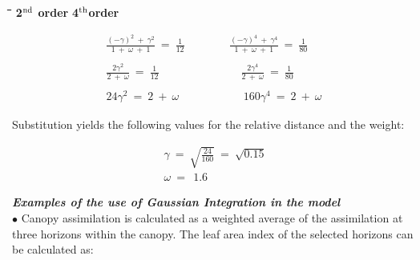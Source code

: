 \documentclass[11pt]{article}
\begin{document}
\bigskip
\bigskip
\bigskip
\bigskip
\bigskip
\bigskip
\bigskip
\bigskip
\bigskip
\bigskip
\bigskip
\bigskip
\bigskip
\bigskip
\bigskip
\nwln
\begin{tabbing}
\hspace{1.27cm}\=\hspace{1.27cm}\=\hspace{1.27cm}\=\hspace{1.27cm}\=%
\hspace{1.27cm}\=\hspace{1.27cm}\=\hspace{1.27cm}\=\hspace{1.27cm}\=%
\hspace{1.27cm}\=\hspace{1.27cm}\=\kill
\>\> {\bf 2$^{{\rm nd}}$ order}\> \> \> \> \> {\bf 4$^{{\rm th}}$order}
\end{tabbing}

\begin{eqnarray*}
{{\frac{(- \gamma ) ^{2} ~+~ \gamma ^{2} }{1~+~\omega  ~+~1}} ~=~{\frac{1}{12}} } ~~~~~~~~~~~~~~~~~~ {{\frac{(- \gamma ) ^{4} ~+~ \gamma ^{4} }{1~+~\omega  ~+~1}} ~=~{\frac{1}{80}} } \nonumber  \\
~ \nonumber  \\
{{\frac{2 \gamma ^{2} }{2~+~ \omega  }} ~=~{\frac{1}{12}} ~~~~~~~~~~~~~~~~~~~~~~~~~~~~~~~~~{\frac{2 \gamma ^{4} }{2~+~ \omega  }} ~=~{\frac{1}{80}} } \nonumber  \\
~ \nonumber  \\
24 \gamma ^{2} ~=~ 2 ~+~ \omega  ~~~~~~~~~~~~~~~~~~~~~~~~~~ 160 \gamma ^{4} ~=~ 2~+~ \omega
\end{eqnarray*}

\bigskip
\bigskip
\bigskip
\bigskip
\bigskip
\bigskip
\bigskip
\bigskip
\bigskip
\bigskip
\bigskip
\bigskip
Substitution yields the following values for the relative distance and the weight:

\begin{eqnarray*}
~\gamma ~=~\sqrt{{\frac{24}{160}} } ~=~ \sqrt{0.15} \nonumber  \\
~\omega  ~=~~1.6
\end{eqnarray*}

\bigskip
\bigskip
\bigskip
\bigskip
\bigskip
\bigskip
\bigskip
\bigskip
\bigskip
\bigskip
{\bf {\it Examples of the use of Gaussian Integration in the model\/}}\\
$\bullet$ Canopy assimilation is calculated as a weighted average of the assimilation at three
horizons within the canopy. The leaf area index of the selected horizons can be calculated
as:
\end{document}
